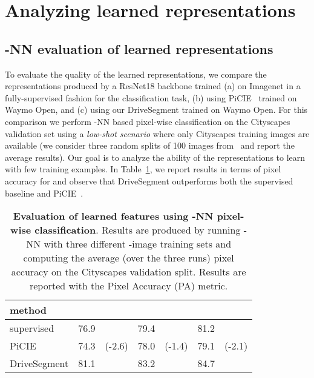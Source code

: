 \documentclass[runningheads]{llncs}
\newcommand{\ours}{DriveSegment\xspace}
\begin{document}
\section{Analyzing learned representations}

\subsection{-NN evaluation of learned representations}
\label{sec:knn_eval}
To evaluate the quality of the learned representations, we compare the representations produced by a ResNet18 backbone trained (a) on Imagenet in a fully-supervised fashion for the classification task, 
(b) using PiCIE~\cite{cho2021picie} trained on Waymo Open, and (c) using our \ours trained on Waymo Open.
For this comparison we perform -NN based pixel-wise classification on the Cityscapes validation set using a \emph{low-shot scenario} where only  Cityscapes training images are available (we consider three random splits of 100 images from~\cite{french2020semi} and report the average results). 
Our goal is to analyze the ability of the representations to learn with few training examples.
In Table~\ref{tab:knn_eval_wDiff}, we report results in terms of pixel accuracy 
for  and observe that \ours outperforms both the supervised baseline and PiCIE~\cite{cho2021picie}.

\begin{table}[t]
    \centering
    \caption{\textbf{Evaluation of learned features using -NN pixel-wise classification}. Results are produced by running -NN with three different -image training sets \cite{french2020semi} and computing the average (over the three runs) pixel accuracy on the Cityscapes validation split. Results are reported with the Pixel Accuracy (PA) metric.
    }
    \label{tab:knn_eval_wDiff}
    \begin{tabular}{l|cr|cr|cr}
    \toprule
    method & \multicolumn{2}{c|}{} & \multicolumn{2}{c|}{} & \multicolumn{2}{c}{} \\
    \hline
    supervised & 76.9 & & 79.4 & & 81.2 & \\
    PiCIE~\cite{cho2021picie} & 74.3 & (-2.6) & 78.0 & (-1.4) & 79.1 & (-2.1) \\
    \ours & 81.1 & {\color{better}{(+4.2)}} & 83.2 & {\color{better}{(+3.8)}} & 84.7 & {\color{better}{(+3.5)}} \\
    \bottomrule
    \end{tabular}
\end{table}
\end{document}
